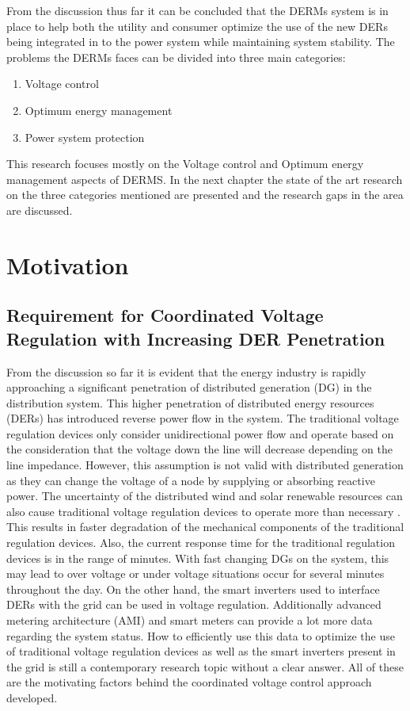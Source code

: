 From the discussion thus far it can be concluded that the DERMs system is in place to help both the utility and consumer optimize the use of the new DERs being integrated in to the power system while maintaining system stability. The problems the DERMs faces can be divided into three main categories:
\begin{enumerate}
    \item Voltage control
    \item Optimum energy management
    \item Power system protection
\end{enumerate}

This research focuses mostly on the Voltage control and Optimum energy management aspects of DERMS. In the next chapter the state of the art research on the three categories mentioned are presented and the research gaps in the area are discussed.

\section{Motivation}
\subsection{Requirement for Coordinated Voltage Regulation with Increasing DER Penetration}
From the discussion so far it is evident that the energy industry is rapidly approaching a significant penetration of distributed generation (DG) in the distribution system. This higher penetration of distributed energy resources (DERs) has introduced reverse power flow in the system. The traditional voltage regulation devices only consider unidirectional power flow and operate based on the consideration that the voltage down the line will decrease depending on the line impedance. However, this assumption is not valid with distributed generation as they can change the voltage of a node by supplying or absorbing reactive power. The uncertainty of the distributed wind and solar renewable resources can also cause traditional voltage regulation devices to operate more than necessary \cite{int1}. This results in faster degradation of the mechanical components of the traditional regulation devices. Also, the current response time for the traditional regulation devices is in the range of minutes. With fast changing DGs on the system, this may lead to over voltage or under voltage situations occur for several minutes throughout the day. On the other hand, the smart inverters used to interface DERs with the grid can be used in voltage regulation. Additionally advanced metering architecture (AMI) and smart meters can provide a lot more data regarding the system status. How to efficiently use this data to optimize the use of traditional voltage regulation devices as well as the smart inverters present in the grid is still a contemporary research topic without a clear answer. All of these are the motivating factors behind the coordinated voltage control approach developed.


